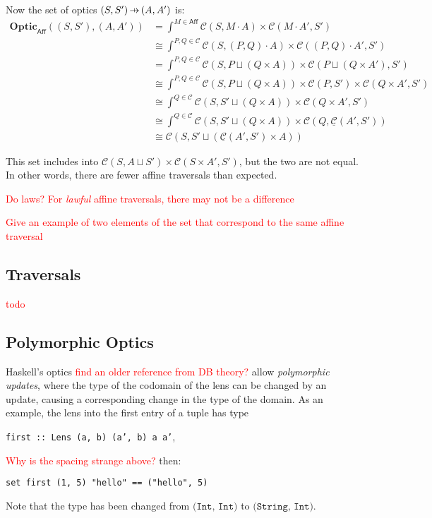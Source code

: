 \documentclass[11pt,a4paper]{article}
\theoremstyle{plain}
\theoremstyle{definition}
\newcommand{\C}{\mathscr{C}}
\newcommand{\homC}{\underline{\C}}
\newcommand{\Optic}{\mathbf{Optic}}
\newcommand{\hto}{\ensuremath{\,\mathaccent\shortmid\rightarrow\,}}
\newcommand{\todo}[1]{\textcolor{red}{\small #1}}
\begin{document}
Now the set of optics $(S, S') \hto (A, A')$ is:
\begin{align*}
\Optic_{\mathsf{Aff}}((S, S'), (A, A')) 
&= \int^{M \in \mathsf{Aff}} \C(S, M \cdot A) \times \C(M \cdot A', S') \\
&\cong \int^{P,Q \in \C} \C(S, (P,Q) \cdot A) \times \C((P,Q) \cdot A', S') \\
&= \int^{P,Q \in \C} \C(S, P \sqcup (Q \times A)) \times \C(P \sqcup (Q \times A'), S') \\
&\cong \int^{P,Q \in \C} \C(S, P \sqcup (Q \times A)) \times \C(P,S') \times \C(Q \times A', S') \\
&\cong \int^{Q \in \C} \C(S, S' \sqcup (Q \times A)) \times \C(Q \times A', S') \\
&\cong \int^{Q \in \C} \C(S, S' \sqcup (Q \times A)) \times \C(Q, \homC(A', S')) \\
&\cong \C(S, S' \sqcup (\homC(A', S') \times A))
\end{align*}

This set includes into $\C(S, A \sqcup S') \times \C(S\times A', S')$, but the two are not equal. In other words, there are fewer affine traversals than expected.

\todo{Do laws? For \emph{lawful} affine traversals, there may not be a difference}

\todo{Give an example of two elements of the set that correspond to the same affine traversal}

\subsection{Traversals}
\todo{todo}

\subsection{Polymorphic Optics}
Haskell's optics \todo{find an older reference from DB theory?} allow \emph{polymorphic updates}, where the type of the codomain of the lens can be changed by an update, causing a corresponding change in the type of the domain. As an example, the lens into the first entry of a tuple has type
\begin{center}
\texttt{first :: Lens (a, b) (a', b) a a'},
\end{center}
\todo{Why is the spacing strange above?} then:
\begin{center}
\texttt{set first (1, 5) "hello" == ("hello", 5)}
\end{center}
Note that the type has been changed from $\texttt{(Int, Int)}$ to $\texttt{(String, Int)}$.
\end{document}
